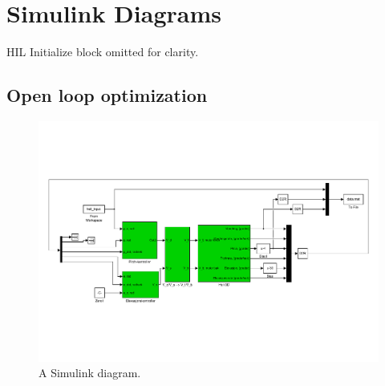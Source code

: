 \section{Simulink Diagrams}\label{sec:simulink}
HIL Initialize block omitted for clarity.

\subsection{Open loop optimization}
\begin{figure}[htb]
	\centering
		\includegraphics[width = \textwidth]{figures/2/helikopter_openloop.pdf}
	\caption{A Simulink diagram.}
\end{figure}
